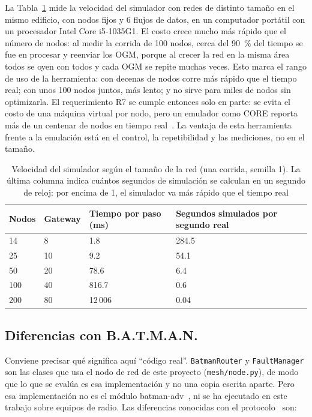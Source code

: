 La Tabla~\ref{tab:escala} mide la velocidad del simulador con redes de distinto
tamaño en el mismo edificio, con nodos fijos y 6 flujos de datos, en un
computador portátil con un procesador Intel Core i5-1035G1. El costo crece
mucho más rápido que el número de nodos: al medir la corrida de 100 nodos, cerca
del 90~\% del tiempo se fue en procesar y reenviar los OGM, porque al crecer la
red en la misma área todos se oyen con todos y cada OGM se repite muchas veces.
Esto marca el rango de uso de la herramienta: con decenas de nodos corre más
rápido que el tiempo real; con unos 100 nodos juntos, más lento; y no sirve para
miles de nodos sin optimizarla. El requerimiento R7 se cumple entonces solo en
parte: se evita el costo de una máquina virtual por nodo, pero un emulador como
CORE reporta más de un centenar de nodos en tiempo
real~\cite{Ahrenholz2008Core}. La ventaja de esta herramienta frente a la
emulación está en el control, la repetibilidad y las mediciones, no en el
tamaño.

\begin{table}[htbp!]
    \centering
    \caption{Velocidad del simulador según el tamaño de la red (una corrida, semilla 1). La última columna indica cuántos segundos de simulación se calculan en un segundo de reloj: por encima de 1, el simulador va más rápido que el tiempo real}
    \label{tab:escala}
    \footnotesize
    \begin{tabular}{|p{2.4cm}|p{2.4cm}|p{3.0cm}|p{3.2cm}|}
        \hline
        \textbf{Nodos} & \textbf{Gateway} & \textbf{Tiempo por paso (ms)} & \textbf{Segundos simulados por segundo real} \\
        \hline
        14 & 8 & 1.8 & 284.5 \\
        \hline
        25 & 10 & 9.2 & 54.1 \\
        \hline
        50 & 20 & 78.6 & 6.4 \\
        \hline
        100 & 40 & 816.7 & 0.6 \\
        \hline
        200 & 80 & 12\,006 & 0.04 \\
        \hline
    \end{tabular}
\end{table}

\subsection{Diferencias con B.A.T.M.A.N.}
\label{sec:fidelidad}

Conviene precisar qué significa aquí ``código real''. \texttt{BatmanRouter} y
\texttt{FaultManager} son las clases que usa el nodo de red de este proyecto
(\texttt{mesh/node.py}), de modo que lo que se evalúa es esa implementación y
no una copia escrita aparte. Pero esa implementación no es el módulo
batman-adv~\cite{OpenMesh2024Batmanadv}, ni se ha ejecutado en este trabajo
sobre equipos de radio. Las diferencias conocidas con el
protocolo~\cite{Neumann2008Batman} son:

